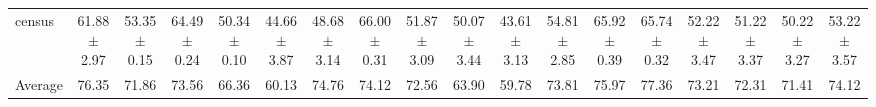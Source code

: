 \begin{table}[ht]
\begin{adjustbox}{max width=\textwidth}
\begin{tabular}{lccccccccccccccccc}
          census &  61.88 $\pm$ 2.97 &  53.35 $\pm$ 0.15 &  64.49 $\pm$ 0.24 &  50.34 $\pm$ 0.10 &  44.66 $\pm$ 3.87 &  48.68 $\pm$ 3.14 &  66.00 $\pm$ 0.31 & 51.87 $\pm$ 3.09 &  50.07 $\pm$ 3.44 &  43.61 $\pm$ 3.13 &  54.81 $\pm$ 2.85 &  65.92 $\pm$ 0.39 &  65.74 $\pm$ 0.32 &  52.22 $\pm$ 3.47 &  51.22 $\pm$ 3.37 &  50.22 $\pm$ 3.27 &  53.22 $\pm$ 3.57 \\
         Average &             76.35 &             71.86 &             73.56 &             66.36 &             60.13 &             74.76 &             74.12 &            72.56 &             63.90 &             59.78 &             73.81 &             75.97 &             77.36 &             73.21 &             72.31 &             71.41 &             74.12 \\
\bottomrule
\end{tabular}
    \end{adjustbox}
\end{table}



